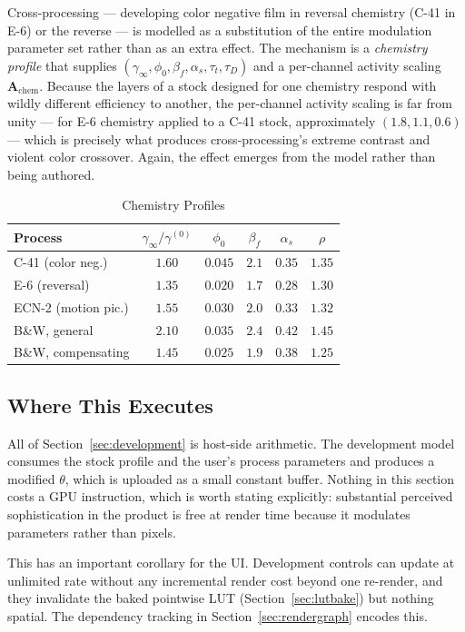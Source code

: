 Cross-processing --- developing color negative film in reversal chemistry
(C-41 in E-6) or the reverse --- is modelled as a substitution of the entire
modulation parameter set rather than as an extra effect. The mechanism is a
\emph{chemistry profile} that supplies $(\gamma_\infty, \phi_0, \beta_f,
\alpha_s, \tau_t, \tau_D)$ and a per-channel activity scaling
$\mathbf{A}_{\mathrm{chem}}$. Because the layers of a stock designed for one
chemistry respond with wildly different efficiency to another, the per-channel
activity scaling is far from unity --- for E-6 chemistry applied to a C-41
stock, approximately $(1.8, 1.1, 0.6)$ --- which is precisely what produces
cross-processing's extreme contrast and violent color crossover. Again, the
effect emerges from the model rather than being authored.

\begin{table}[htbp]
\caption{Chemistry Profiles}
\label{tab:chemistry}
\begin{center}
\renewcommand{\arraystretch}{1.15}
\begin{tabular}{@{}lccccc@{}}
\toprule
\textbf{Process} & $\gamma_\infty/\gamma^{(0)}$ & $\phi_0$ & $\beta_f$ & $\alpha_s$ & $\rho$ \\
\midrule
C-41 (color neg.)   & $1.60$ & $0.045$ & $2.1$ & $0.35$ & $1.35$ \\
E-6 (reversal)      & $1.35$ & $0.020$ & $1.7$ & $0.28$ & $1.30$ \\
ECN-2 (motion pic.) & $1.55$ & $0.030$ & $2.0$ & $0.33$ & $1.32$ \\
B\&W, general       & $2.10$ & $0.035$ & $2.4$ & $0.42$ & $1.45$ \\
B\&W, compensating  & $1.45$ & $0.025$ & $1.9$ & $0.38$ & $1.25$ \\
\bottomrule
\end{tabular}
\end{center}
\end{table}

\subsection{Where This Executes}

All of Section~\ref{sec:development} is host-side arithmetic. The development
model consumes the stock profile and the user's process parameters and produces
a modified $\theta$, which is uploaded as a small constant buffer. Nothing in
this section costs a GPU instruction, which is worth stating explicitly:
substantial perceived sophistication in the product is free at render time
because it modulates parameters rather than pixels.

This has an important corollary for the UI. Development controls can update at
unlimited rate without any incremental render cost beyond one re-render, and
they invalidate the baked pointwise LUT (Section~\ref{sec:lutbake}) but nothing
spatial. The dependency tracking in Section~\ref{sec:rendergraph} encodes this.
